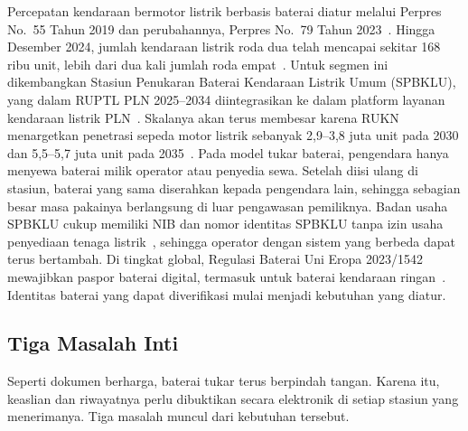 \documentclass[11pt,a4paper]{article}
\begin{document}
Percepatan kendaraan bermotor listrik berbasis baterai diatur melalui Perpres No.~55 Tahun 2019 dan perubahannya, Perpres No.~79 Tahun 2023~\cite{perpres55,perpres79}. Hingga Desember 2024, jumlah kendaraan listrik roda dua telah mencapai sekitar 168 ribu unit, lebih dari dua kali jumlah roda empat~\cite{ruptl}. Untuk segmen ini dikembangkan Stasiun Penukaran Baterai Kendaraan Listrik Umum (SPBKLU), yang dalam RUPTL PLN 2025--2034 diintegrasikan ke dalam platform layanan kendaraan listrik PLN~\cite{ruptl}. Skalanya akan terus membesar karena RUKN menargetkan penetrasi sepeda motor listrik sebanyak 2,9--3,8 juta unit pada 2030 dan 5,5--5,7 juta unit pada 2035~\cite{rukn}. Pada model tukar baterai, pengendara hanya menyewa baterai milik operator atau penyedia sewa. Setelah diisi ulang di stasiun, baterai yang sama diserahkan kepada pengendara lain, sehingga sebagian besar masa pakainya berlangsung di luar pengawasan pemiliknya. Badan usaha SPBKLU cukup memiliki NIB dan nomor identitas SPBKLU tanpa izin usaha penyediaan tenaga listrik~\cite{rukn}, sehingga operator dengan sistem yang berbeda dapat terus bertambah. Di tingkat global, Regulasi Baterai Uni Eropa 2023/1542 mewajibkan paspor baterai digital, termasuk untuk baterai kendaraan ringan~\cite{eubat}. Identitas baterai yang dapat diverifikasi mulai menjadi kebutuhan yang diatur.

\subsection{Tiga Masalah Inti}

Seperti dokumen berharga, baterai tukar terus berpindah tangan. Karena itu, keaslian dan riwayatnya perlu dibuktikan secara elektronik di setiap stasiun yang menerimanya. Tiga masalah muncul dari kebutuhan tersebut.
\end{document}
